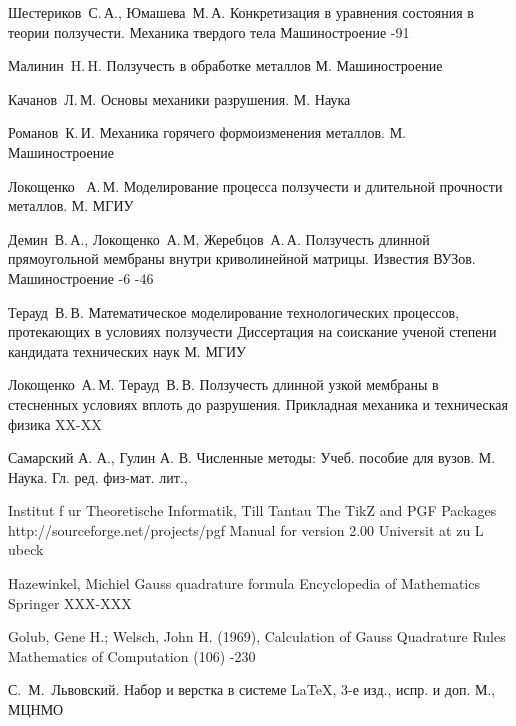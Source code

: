 
\renewcommand{\bibname}{Список источников}
\begin{thebibliography}{2013}
\label{shest}
\by Шестериков~С.\,А., Юмашева~М.\,А.
\paper Конкретизация в уравнения состояния в теории ползучести.
\jour Механика твердого тела
\publ Машиностроение
-91


\label{malinin}
\by Малинин~H.\,H.
\book Ползучесть в обработке металлов
\publaddr М.
\publ Машиностроение

\label{kachanov}
\by Качанов~Л.\,М.
\book Основы механики разрушения.
\publaddr М.
\publ Наука

\label{romanov}
\by Романов~К.\,И.
\book Механика горячего формоизменения металлов.
\publaddr М.
\publ Машиностроение


\label{lokoschenko}
\by Локощенко	~А.\,М.
\book Моделирование процесса ползучести и длительной прочности металлов.
\publaddr М.
\publ МГИУ

\label{jerebcov}
	\by Демин~В.\,А., Локощенко~А.\,М, Жеребцов~А.\,А. 
	\paper Ползучесть длинной прямоугольной мембраны внутри криволинейной матрицы. 
	\jour Известия ВУЗов. Машиностроение
	-6
	-46

	
\label{teraud_dis}
	\by Терауд~В.\,В.
	\book Математическое моделирование технологических процессов, протекающих в условиях ползучести
	\publ Диссертация на соискание ученой степени кандидата технических наук
	\publaddr М. МГИУ

\label{teraud}
	\by Локощенко~А.\,М. Терауд~В.\,В. 
	\paper Ползучесть длинной узкой мембраны в стесненных условиях вплоть до разрушения.
	\jour Прикладная механика и техническая физика	
	\pages XX-XX

  \label{samarskiy} 
\by Самарский А. А., Гулин А. В. 
\book Численные методы: Учеб. пособие для вузов.
\publaddr М. Наука. Гл. ред. физ-мат. лит.,

\label{tikz-manual}
 \by Institut f ur Theoretische Informatik, Till Tantau
 \book The TikZ and PGF Packages http://sourceforge.net/projects/pgf Manual for version 2.00
 \publ Universit at zu L ubeck

\label{gauss_book}
 \by Hazewinkel, Michiel
 \paper Gauss quadrature formula
 \jour Encyclopedia of Mathematics
 \publaddr Springer
 \pages XXX-XXX
 
\label{gauss_article}
  \by Golub, Gene H.; Welsch, John H. (1969), 
  \paper Calculation of Gauss Quadrature Rules
  \jour Mathematics of Computation
   (106)
  -230

\by С.~М.~Львовский.
\book Набор и верстка в системе \LaTeX, 3-е изд., испр. и доп.
\publaddr М., МЦНМО

\end{thebibliography}

\endinput
